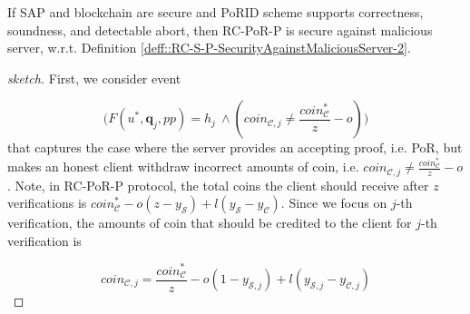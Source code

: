 
 \begin{lemma}
 If SAP and blockchain are secure and  PoRID scheme supports correctness, soundness, and detectable abort, then RC-PoR-P is secure against malicious server, w.r.t. Definition \ref{deff::RC-S-P-SecurityAgainstMaliciousServer-2}. 
 \end{lemma}
 

 \begin{proof}[sketch]
 First, we  consider event  
 
  $$\Big(F(u^{\scriptscriptstyle *}, \bm{q}_{\scriptscriptstyle j},{pp})= h_{\scriptscriptstyle j}\ \wedge (coin_{\scriptscriptstyle\mathcal{C},j}\neq  \frac{coin_{\scriptscriptstyle\mathcal C}^{\scriptscriptstyle*}}{z}-o)\Big)$$
   that captures the case where the server provides an accepting  proof, i.e. PoR, but makes an honest client withdraw  incorrect amounts of coin, i.e. $coin_{\scriptscriptstyle\mathcal{C},j}\neq  \frac{coin_{\scriptscriptstyle\mathcal C}^{\scriptscriptstyle*}}{z}-o$. Note, in RC-PoR-P protocol, the total coins the client should receive after $z$ verifications is   $coin^{\scriptscriptstyle *}_{\scriptscriptstyle\mathcal C}-o(z-y_{\scriptscriptstyle\mathcal S})+l(y_{\scriptscriptstyle\mathcal S}-y_{\scriptscriptstyle\mathcal C})$. Since we focus on  $j$-th verification, the amounts of  coin that should be credited to the client for $j$-th verification is
 
 
% 
  
  \begin{equation}\label{equ::what-client-recives-in-j-2}
   coin_{\scriptscriptstyle\mathcal{C},j}=\frac{coin^{\scriptscriptstyle *}_{\scriptscriptstyle\mathcal C}}{z}-o(1-y_{\scriptscriptstyle\mathcal {S},j})+l(y_{\scriptscriptstyle\mathcal {S},j}-y_{\scriptscriptstyle\mathcal {C},j})
     \end{equation}


\end{proof}
